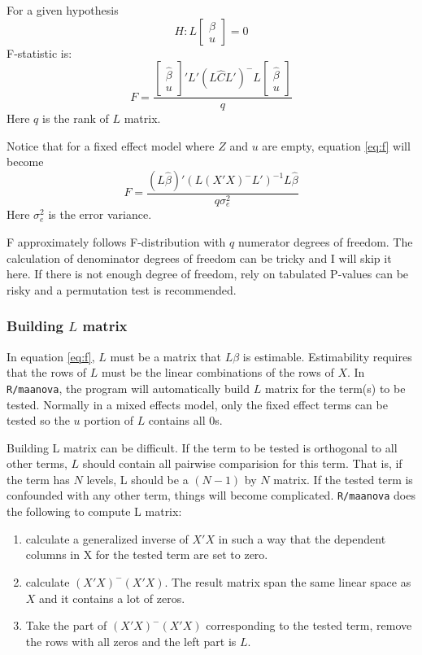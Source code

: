 For a given hypothesis
\begin{equation}
H: L\left[\begin{array}{c}\beta \\ u\end{array}\right]=0
\end{equation}
F-statistic is:
\begin{equation}
F=\frac
  {\left[\begin{array}{c}\hat{\beta}\\u\end{array}\right]'L'
   (L\hat{C}L')^{-}L\left[\begin{array}{c}\hat{\beta}\\u\end{array}\right]}
  {q}
\label{eq:f}
\end{equation}
Here $q$ is the rank of $L$ matrix. 

Notice that for a fixed effect model where $Z$ and $u$ 
are empty, equation \ref{eq:f} will become 
\begin{equation}
F=\frac
  {(L\hat{\beta})'(L(X'X)^{-}L')^{-1}L\hat{\beta}}
  {q\sigma_e^{2}}
\end{equation}
Here $\sigma_e^2$ is the error variance.

F approximately follows F-distribution
with $q$ numerator degrees 
of freedom. The calculation of denominator degrees of
freedom can be tricky and I will skip it here. If there is 
not enough degree of freedom, rely on tabulated P-values
can be risky and a permutation test is recommended.  

\subsubsection{Building $L$ matrix}
In equation \ref{eq:f}, $L$ must be a matrix that $L\beta$
is estimable. Estimability requires that the rows of $L$
must be the linear combinations of the rows of $X$. 
In {\tt R/maanova}, the program will automatically 
build $L$ matrix for the term(s) to be tested.
Normally in a mixed effects model, only the fixed
effect terms can be tested so the $u$ portion of
$L$ contains all 0s.

Building L matrix can be difficult. If the term to be
tested is orthogonal to all other terms, $L$ should contain
all pairwise comparision for this term. That is, if the term
has $N$ levels, L should be a $(N-1)$ by $N$ matrix.
If the tested term is confounded with any other term, 
things will become complicated. {\tt R/maanova} 
does the following to compute L matrix:
\begin{enumerate}
\item calculate a generalized inverse of $X'X$ in such
a way that the dependent columns in X for the tested term
are set to zero. 
\item calculate $(X'X)^-(X'X)$. The result matrix span 
the same linear space as $X$ and it contains a lot of zeros.
\item Take the part of $(X'X)^-(X'X)$ corresponding to 
the tested term, remove the rows with all zeros and
the left part is $L$.
\end{enumerate}

